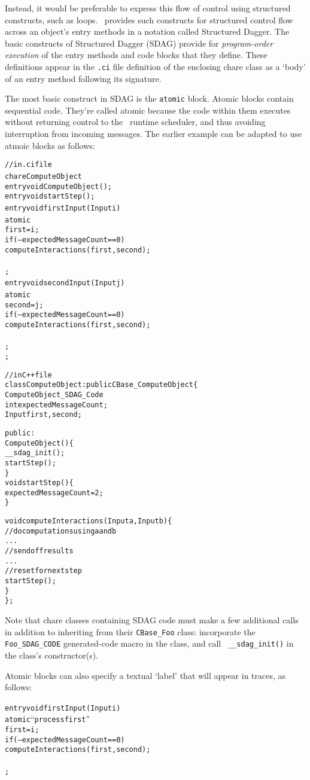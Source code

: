 Instead, it would be preferable to express this flow of control using
structured constructs, such as loops. \charmpp\ provides such constructs for
structured control flow across an object's entry methods in a notation called
Structured Dagger. The basic constructs of Structured Dagger (SDAG) provide for
\emph{program-order execution} of the entry methods and code blocks that they
define. These definitions appear in the {\tt .ci} file definition of the
enclosing chare class as a `body' of an entry method following its signature.

The most basic construct in SDAG is the {\tt atomic} block. Atomic blocks
contain sequential \CC code.  They're called atomic because the code within
them executes without returning control to the \charmpp\ runtime scheduler, and
thus avoiding interruption from incoming messages. The earlier example can be
adapted to use atmoic blocks as follows:
\begin{center}
\begin{alltt}
// in .ci file
chare ComputeObject {
  entry void ComputeObject();
  entry void startStep();
  entry void firstInput(Input i) {
    atomic {
      first = i;
      if (--expectedMessageCount == 0)
        computeInteractions(first, second);
    }
  };
  entry void secondInput(Input j){
    atomic {
      second = j;
      if (--expectedMessageCount == 0)
        computeInteractions(first, second);
    }
  };
};

// in C++ file
class ComputeObject : public CBase_ComputeObject \{
  ComputeObject_SDAG_Code
  int   expectedMessageCount;
  Input first, second;

public:
  ComputeObject() \{
    __sdag_init();
    startStep();
  \}
  void startStep() \{
    expectedMessageCount = 2;
  \}

  void computeInteractions(Input a, Input b) \{
    // do computations using a and b
    . . .
    // send off results
    . . .
    // reset for next step
    startStep();
  \}
\};
\end{alltt}
\end{center}
Note that chare classes containing SDAG code must make a few additional calls
in addition to inheriting from their {\tt CBase_Foo} class: incorporate the
{\tt Foo_SDAG_CODE} generated-code macro in the class, and call {\tt
  __sdag_init()} in the class's constructor(s).

Atomic blocks can also specify a textual `label' that will appear in traces, as
follows:
\begin{center}
\begin{alltt}
  entry void firstInput(Input i) {
    atomic ``process first'' {
      first = i;
      if (--expectedMessageCount == 0)
        computeInteractions(first, second);
    }
  };
\end{alltt}
\end{center}

